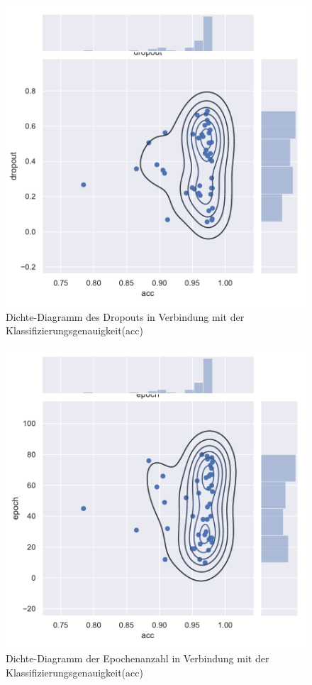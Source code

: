 \begin{figure}[H]
  \centering  
  \includegraphics[scale=0.5]{anhang/GA_250_mnist_digits_False_small_jointplot_dropout.pdf}
  \caption{Dichte-Diagramm des Dropouts in Verbindung mit der Klassifizierungsgenauigkeit(acc)}
  
\end{figure}

\begin{figure}[H]
  \centering  
  \includegraphics[scale=0.5]{anhang/GA_250_mnist_digits_False_small_jointplot_epoch.pdf}
  \caption{Dichte-Diagramm der Epochenanzahl in Verbindung mit der Klassifizierungsgenauigkeit(acc)}
  
\end{figure}


